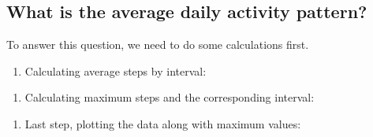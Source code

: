 \documentclass[
]{article}
\newenvironment{Shaded}{\begin{snugshade}}{\end{snugshade}}
\newcommand{\DataTypeTok}[1]{\textcolor[rgb]{0.13,0.29,0.53}{#1}}
\newcommand{\KeywordTok}[1]{\textcolor[rgb]{0.13,0.29,0.53}{\textbf{#1}}}
\newcommand{\NormalTok}[1]{#1}
\newcommand{\OperatorTok}[1]{\textcolor[rgb]{0.81,0.36,0.00}{\textbf{#1}}}
\newcommand{\StringTok}[1]{\textcolor[rgb]{0.31,0.60,0.02}{#1}}
\providecommand{\tightlist}{%
  \setlength{\itemsep}{0pt}\setlength{\parskip}{0pt}}
\begin{document}
\hypertarget{what-is-the-average-daily-activity-pattern}{%
\subsection{What is the average daily activity
pattern?}\label{what-is-the-average-daily-activity-pattern}}

To answer this question, we need to do some calculations first.

\begin{enumerate}
\def\labelenumi{\arabic{enumi}.}
\tightlist
\item
  Calculating average steps by interval:
\end{enumerate}

\begin{Shaded}
\end{Shaded}

\begin{enumerate}
\def\labelenumi{\arabic{enumi}.}
\setcounter{enumi}{1}
\tightlist
\item
  Calculating maximum steps and the corresponding interval:
\end{enumerate}

\begin{Shaded}
\end{Shaded}

\begin{enumerate}
\def\labelenumi{\arabic{enumi}.}
\setcounter{enumi}{2}
\tightlist
\item
  Last step, plotting the data along with maximum values:
\end{enumerate}
\end{document}
